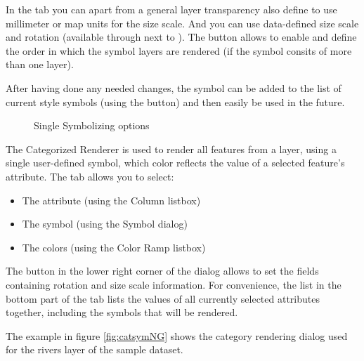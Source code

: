 In the  tab you can apart from a general layer transparency also 
define to use millimeter or map units for the size scale. And you can use 
data-defined size scale and rotation (available through  
next to ). The  button allows to 
enable and define the order in which the symbol layers are rendered (if the 
symbol consits of more than one layer).

After having done any needed changes, the symbol can be added to the list 
of current style symbols (using the  button) and then 
easily be used in the future.

\begin{figure}[ht]
\centering
   \hspace{1cm}
   \hspace{1cm}
\caption{Single Symbolizing options \nixcaption}
\end{figure}


The Categorized Renderer is used to render all features from a layer, using a
single user-defined symbol, which color reflects the value of a selected
feature's attribute. The  tab allows you to select:

\begin{itemize}[label=--]
\item The attribute (using the Column listbox)
\item The symbol (using the Symbol dialog)
\item The colors (using the Color Ramp listbox)
\end{itemize}

The  button in the lower right corner of the dialog allows to set
the fields containing rotation and size scale information.
For convenience, the list in the bottom part of the tab lists the values of
all currently selected attributes together, including the symbols that will
be rendered.

The example in figure \ref{fig:catsymNG} shows the category rendering dialog
used for the rivers layer of the \qg sample dataset.

